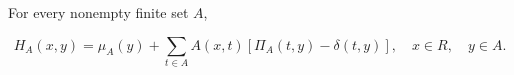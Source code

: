 For every nonempty finite set $A$,

$$H_A(x,y) = \mu_A(y) + \sum_{t \in A} A(x,t)[\Pi_A(t,y) - \delta(t,y)], \quad x \in R, \quad y \in A.$$